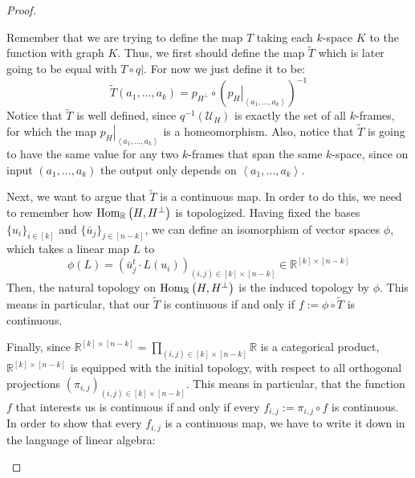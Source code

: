 \begin{proof}
\begin{b_item}
Remember that we are trying to define the map $T$ taking each $k$-space $K$ to the function with graph $K$. Thus, we first should define the map $\tilde T$ which is later going to be equal with $T\circ\left.q\right|$. For now we just define it to be:
$$\tilde T(a_1,\ldots,a_k)=p_{H^{\perp}}\circ\left(\left.p_H\right|_{\left<a_1,\ldots,a_k\right>}\right)^{-1}$$
Notice that $\tilde T$ is well defined, since $q^{-1}\left(\mathcal{U}_H\right)$ is exactly the set of all $k$-frames, for which the map $\left.p_H\right|_{\left<a_1,\ldots,a_k\right>}$ is a homeomorphism. Also, notice that $\tilde T$ is going to have the same value for any two $k$-frames that span the same $k$-space, since on input $(a_1,\ldots,a_k)$ the output only depends on $\left<a_1,\ldots,a_k\right>$.

Next, we want to argue that $\tilde T$ is a continuous map. In order to do this, we need to remember how $\mathrm{Hom}_{\mathbb{R}}\left(H,H^{\perp}\right)$ is topologized. Having fixed the bases $\{u_i\}_{i\in[k]}$ and $\{\bar{u}_j\}_{j\in[n-k]}$, we can define an isomorphism of vector spaces $\phi$, which takes a linear map $L$ to
$$\phi(L)=\left(\bar{u}_j^t\cdot L(u_i)\right)_{(i,j)\in[k]\times[n-k]}\in\mathbb{R}^{[k]\times[n-k]}$$
Then, the natural topology on $\mathrm{Hom}_{\mathbb{R}}\left(H,H^{\perp}\right)$ is the induced topology by $\phi$. This means in particular, that our $\tilde T$ is continuous if and only if $f:=\phi\circ\tilde T$ is continuous.

Finally, since $\mathbb{R}^{[k]\times[n-k]}=\prod_{(i,j)\in[k]\times[n-k]}\mathbb{R}$ is a categorical product, $\mathbb{R}^{[k]\times[n-k]}$ is equipped with the initial topology, with respect to all orthogonal projections $\left(\pi_{i,j}\right)_{(i,j)\in[k]\times[n-k]}$. This means in particular, that the function $f$ that interests us is continuous if and only if every $f_{i,j}:=\pi_{i,j}\circ f$ is continuous. In order to show that every $f_{i,j}$ is a continuous map, we have to write it down in the language of linear algebra:


\end{b_item}
\end{proof}
